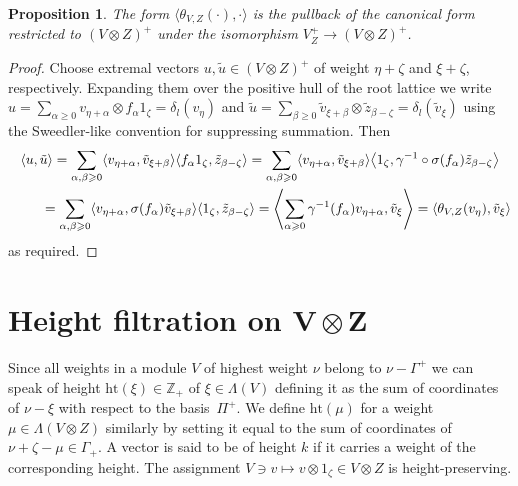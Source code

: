 \documentclass[11pt]{article}
\numberwithin{equation}{section}
\newtheorem{Proposition}[Theorem]{Proposition}
 { \theoremstyle{definition}
\newtheorem{Definition}[Theorem]{Definition}
\newtheorem{Example}[Theorem]{Example}
\newtheorem{Remark}[Theorem]{Remark} }
\begin{document}
\begin{Proposition} The form $\langle \theta_{V,Z}(\cdot),\cdot \rangle$ is the pullback of the canonical form restricted to \linebreak $(V \otimes Z)^+$ under the isomorphism $V^+_Z\to (V\otimes Z)^+$.
\end{Proposition}
\begin{proof}Choose extremal vectors $u, \tilde u \in (V\otimes Z)^+$ of weight $\eta +\zeta$ and $\xi+\zeta$, respectively. Expanding them over the positive hull of the root lattice we write $u=\sum_{\alpha\geqslant0}v_{\eta+\alpha}\otimes f_\alpha1_\zeta =\delta_l(v_\eta)$ and $\tilde u=\sum_{\beta\geqslant0} \tilde v_{\xi+\beta}\otimes \tilde z_{\beta-\zeta}=\delta_l(\tilde v_\xi)$ using the Sweedler-like convention for suppressing summation. Then{\samepage
\begin{gather*}
\langle u, \tilde u\rangle =\sum_{\alpha,\beta\geqslant0}\langle v_{\eta+\alpha},\tilde v_{\xi+\beta}\rangle \langle f_\alpha 1_\zeta, \tilde z_{\beta-\zeta}\rangle
=\sum_{\alpha,\beta\geqslant0}\langle v_{\eta+\alpha},\tilde v_{\xi+\beta}\rangle \big\langle 1_\zeta, \gamma^{-1}\circ \sigma(f_\alpha)\tilde z_{\beta-\zeta}\big\rangle\\
\hphantom{\langle u, \tilde u\rangle}{} =\sum_{\alpha,\beta\geqslant0}\langle v_{\eta+\alpha},\sigma(f_\alpha) \tilde v_{\xi+\beta}\rangle \langle 1_\zeta, \tilde z_{\beta-\zeta}\rangle
=\left\langle \sum_{\alpha\geqslant0}\gamma^{-1}(f_\alpha) v_{\eta+\alpha},\tilde v_{\xi}\right\rangle
=\langle \theta_{V,Z}(v_{\eta}),\tilde v_{\xi}\rangle
\end{gather*}
as required.}
\end{proof}

\section[Height filtration on $V\otimes Z$]{Height filtration on $\boldsymbol{V\otimes Z}$}

Since all weights in a module $V$ of highest weight $\nu$ belong to $\nu-\Gamma^+$ we can speak of height $\mathrm{ht}(\xi)\in \mathbb{Z}_+$ of $\xi\in \Lambda(V)$ defining it as the sum of coordinates of $\nu-\xi$ with respect to the basis~$\Pi^+$. We define $\mathrm{ht}(\mu)$ for a weight $\mu\in \Lambda(V\otimes Z)$ similarly by setting it equal to the sum of coordinates of $\nu+\zeta-\mu\in \Gamma_+$. A vector is said to be of height $k$ if it carries a weight of the corresponding height. The assignment $V\ni v\mapsto v\otimes 1_\zeta\in V\otimes Z$ is height-preserving.
\end{document}
